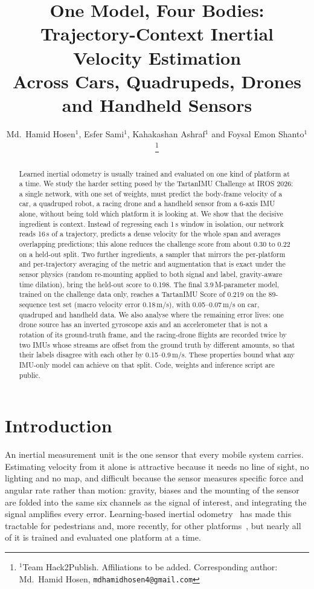 \documentclass[letterpaper,10pt,conference]{ieeeconf}
\title{\LARGE \bf One Model, Four Bodies: Trajectory-Context Inertial Velocity Estimation\\
Across Cars, Quadrupeds, Drones and Handheld Sensors}
\author{Md.\ Hamid Hosen$^{1}$, Esfer Sami$^{1}$, Kahakashan Ashraf$^{1}$ and Foysal Emon Shanto$^{1}$%
\thanks{$^{1}$Team Hack2Publish. Affiliations to be added. Corresponding author: Md.\ Hamid Hosen,
{\tt\small mdhamidhosen4@gmail.com}}%
}
\begin{document}
\maketitle
\thispagestyle{empty}
\pagestyle{empty}

\begin{abstract}
Learned inertial odometry is usually trained and evaluated on one kind of platform at a time. We study the harder
setting posed by the TartanIMU Challenge at IROS 2026: a single network, with one set of weights, must predict the
body-frame velocity of a car, a quadruped robot, a racing drone and a handheld sensor from a 6-axis IMU alone,
without being told which platform it is looking at. We show that the decisive ingredient is context. Instead of
regressing each 1\,s window in isolation, our network reads 16\,s of a trajectory, predicts a dense velocity for the
whole span and averages overlapping predictions; this alone reduces the challenge score from about 0.30 to 0.22 on a
held-out split. Two further ingredients, a sampler that mirrors the per-platform and per-trajectory averaging of the
metric and augmentation that is exact under the sensor physics (random re-mounting applied to both signal and
label, gravity-aware time dilation), bring the held-out score to 0.198. The final 3.9\,M-parameter model, trained on
the challenge data only, reaches a TartanIMU Score of 0.219 on the 89-sequence test set (macro velocity error
0.18\,m/s), with 0.05--0.07\,m/s on car, quadruped and handheld data. We also analyse where the remaining error
lives: one drone source has an inverted gyroscope axis and an accelerometer that is not a rotation of its
ground-truth frame, and the racing-drone flights are recorded twice by two IMUs whose streams are offset from the
ground truth by different amounts, so that their labels disagree with each other by 0.15--0.9\,m/s. These
properties bound what any IMU-only model can achieve on that split. Code, weights and inference script are public.
\end{abstract}

\section{Introduction}
An inertial measurement unit is the one sensor that every mobile system carries. Estimating velocity from it alone is
attractive because it needs no line of sight, no lighting and no map, and difficult because the sensor measures
specific force and angular rate rather than motion: gravity, biases and the mounting of the sensor are folded into the
same six channels as the signal of interest, and integrating the signal amplifies every error. Learning-based
inertial odometry~\cite{ronin,tlio,ionet} has made this tractable for pedestrians and, more recently, for other
platforms~\cite{airio,tartanimu}, but nearly all of it is trained and evaluated one platform at a time.
\end{document}
